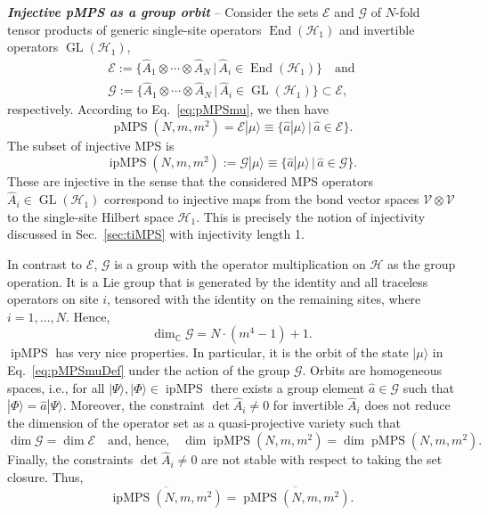 \documentclass[english,11pt,aps,pra,onecolumn,tightenlines,groupedaddress,superscriptaddress,notitlepage,floatfix,fleqn]{revtex4-1}
\newcommand{\ket}{\rangle}
\newcommand{\hA}{\hat{A}}
\newcommand{\CC}{\mathbb{C}}
\newcommand{\mc}[1]{\mathcal{#1}}
\renewcommand{\H}{\mc{H}}
\newcommand{\V}{\mc{V}}
\newcommand{\E}{\mc{E}}
\newcommand{\G}{\mc{G}}
\newcommand{\pMPS}{\operatorname{pMPS}}
\newcommand{\ipMPS}{\operatorname{ipMPS}}
\newcommand{\End}{\operatorname{End}}
\newcommand{\GL}{\operatorname{GL}}
\newcommand{\Emph}[1]{\textbf{\emph{#1}}}
\begin{document}
\Emph{Injective pMPS as a group orbit} --
Consider the sets $\E$ and $\G$ of $N$-fold tensor products of generic single-site operators $\End(\H_1)$ and invertible operators $\GL(\H_1)$,
\begin{subequations}\label{eq:pMPS_E_G}
\begin{gather}
	\E:=\{\hat{A}_1\otimes\dotsb\otimes\hat{A}_N\,|\,\hat{A}_i\in\End(\H_1)\}\quad\text{and}\\
	\G:=\{\hat{A}_1\otimes\dotsb\otimes\hat{A}_N\,|\,\hat{A}_i\in\GL(\H_1)\}\subset\E,
\end{gather}
\end{subequations}
respectively.
According to Eq.~\eqref{eq:pMPSmu}, we then have
\begin{equation}\label{pMPS-setDef}
	\pMPS(N,m,m^2)=\E|\mu\ket
	\equiv\{\hat{a}|\mu\ket\,|\,\hat{a}\in\E\}.
\end{equation}
The subset of injective MPS is
\begin{equation}\label{ipMPS-setDef}
	\ipMPS(N,m,m^2):=\G|\mu\ket
	\equiv\{\hat{a}|\mu\ket\,|\,\hat{a}\in\G\}.
\end{equation}
These are injective in the sense that the considered MPS operators $\hA_i\in\GL(\H_1)$ correspond to injective maps from the bond vector spaces $\V\otimes\V$ to the single-site Hilbert space $\H_1$. This is precisely the notion of injectivity discussed in Sec.~\ref{sec:tiMPS} with injectivity length 1.

In contrast to $\E$, $\G$ is a group with the operator multiplication on $\H$ as the group operation. It is a Lie group that is generated by the identity and all traceless operators on site $i$, tensored with the identity on the remaining sites, where $i=1,\dots, N$. Hence,
\begin{equation}\label{eq:pMPS-dimG}
	\dim_\CC \G=N\cdot(m^4-1)+1.
\end{equation}
$\ipMPS$ has very nice properties. In particular, it is the orbit of the state $|\mu\ket$ in Eq.~\eqref{eq:pMPSmuDef} under the action of the group $\G$. Orbits are homogeneous spaces, i.e., for all $|\Psi\ket,|\Phi\ket\in\ipMPS$ there exists a group element $\hat{a}\in\G$ such that $|\Phi\ket=\hat{a}|\Psi\ket$.
Moreover, the constraint $\det\hat{A}_i\neq 0$ for invertible $\hat{A}_i$ does not reduce the dimension of the operator set as a quasi-projective variety such that
\begin{equation}\label{eq:pMPS-dim0}
	\dim \G=\dim\E\quad\text{and, hence,}\quad
	\dim \ipMPS(N,m,m^2)=\dim \pMPS(N,m,m^2).
\end{equation}
Finally, the constraints $\det\hat{A}_i\neq 0$ are not stable with respect to taking the set closure. Thus,
\begin{equation}
	\overline{\ipMPS(N,m,m^2)}=\overline{\pMPS(N,m,m^2)}.
\end{equation}
\end{document}
